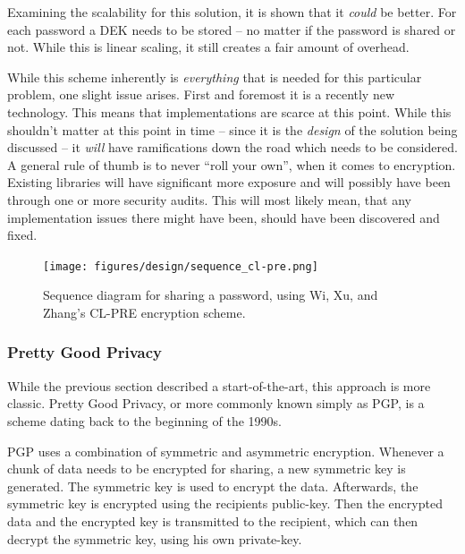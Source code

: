 
				Examining the scalability for this solution, it is shown that it \emph{could} be better. For each password a DEK needs to be stored -- no matter if the password is shared or not. While this is linear scaling, it still creates a fair amount of overhead.

				While this scheme inherently is \emph{everything} that is needed for this particular problem, one slight issue arises. First and foremost it is a recently new technology. This means that implementations are scarce at this point. While this shouldn't matter at this point in time -- since it is the \emph{design} of the solution being discussed -- it \emph{will} have ramifications down the road which needs to be considered. A general rule of thumb is to never ``roll your own'', when it comes to encryption. Existing libraries will have significant more exposure and will possibly have been through one or more security audits. This will most likely mean, that any implementation issues there might have been, should have been discovered and fixed.

				\begin{figure}[h!]
					\centering
					\texttt{[image: figures/design/sequence\_cl-pre.png]}
					\caption{Sequence diagram for sharing a password, using Wi, Xu, and Zhang's CL-PRE encryption scheme.}
					\label{fig:sequence:cl-pre}
				\end{figure}

			\subsubsection{Pretty Good Privacy}
				While the previous section described a start-of-the-art, this approach is more classic. Pretty Good Privacy, or more commonly known simply as PGP, is a scheme dating back to the beginning of the 1990s. 

				PGP uses a combination of symmetric and asymmetric encryption. Whenever a chunk of data needs to be encrypted for sharing, a new symmetric key is generated. The symmetric key is used to encrypt the data. Afterwards, the symmetric key is encrypted using the recipients public-key. Then the encrypted data and the encrypted key is transmitted to the recipient, which can then decrypt the symmetric key, using his own private-key. 

